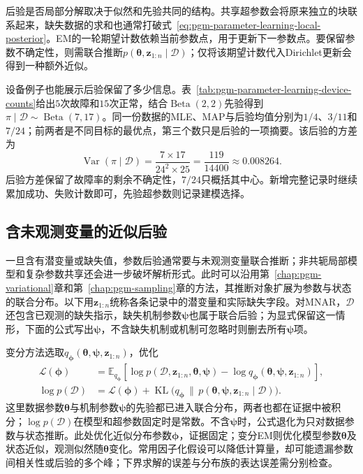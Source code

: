 后验是否局部分解取决于似然和先验共同的结构。共享超参数会将原来独立的块联系起来，缺失数据的求和也通常打破式~\eqref{eq:pgm-parameter-learning-local-posterior}。EM的一轮期望计数依赖当前参数点，用于更新下一参数点。要保留参数不确定性，则需联合推断$p(\bm{\theta},\bm{z}_{1:n}\mid\mathcal{D})$；仅将该期望计数代入Dirichlet更新会得到一种额外近似。

设备例子也能展示后验保留了多少信息。表~\ref{tab:pgm-parameter-learning-device-counts}给出$5$次故障和$15$次正常，结合$\operatorname{Beta}(2,2)$先验得到$\pi\mid\mathcal{D}\sim\operatorname{Beta}(7,17)$。同一份数据的MLE、MAP与后验均值分别为$1/4$、$3/11$和$7/24$；前两者是不同目标的最优点，第三个数只是后验的一项摘要。该后验的方差为
\[
  \operatorname{Var}(\pi\mid\mathcal{D})
   =\frac{7\times17}{24^2\times25}
   =\frac{119}{14400}\approx0.008264.
\]
后验方差保留了故障率的剩余不确定性，$7/24$只概括其中心。新增完整记录时继续累加成功、失败计数即可，先验超参数则记录建模选择。

\subsection{含未观测变量的近似后验}
\label{sec:pgm-parameter-learning-approximate-posterior}

一旦含有潜变量或缺失值，参数后验通常要与未观测变量联合推断；非共轭局部模型和复杂参数共享还会进一步破坏解析形式。此时可以沿用第~\ref{chap:pgm-variational}章和第~\ref{chap:pgm-sampling}章的方法，其推断对象扩展为参数与状态的联合分布。以下用$\bm{z}_{1:n}$统称各条记录中的潜变量和实际缺失字段。对MNAR，$\mathcal{D}$还包含已观测的缺失指示，缺失机制参数$\bm{\psi}$也属于联合后验；为显式保留这一情形，下面的公式写出$\bm{\psi}$，不含缺失机制或机制可忽略时则删去所有$\bm{\psi}$项。

变分方法选取$q_{\bm{\phi}}(\bm{\theta},\bm{\psi},\bm{z}_{1:n})$，优化
\begin{equation}
  \begin{aligned}
    \mathcal{L}(\bm{\phi})
      &=\mathbb{E}_{q_{\bm{\phi}}}
       [\log p(\mathcal{D},\bm{z}_{1:n},\bm{\theta},\bm{\psi})
        -\log q_{\bm{\phi}}
          (\bm{\theta},\bm{\psi},\bm{z}_{1:n})],\\
    \log p(\mathcal{D})
      &=\mathcal{L}(\bm{\phi})
        +\operatorname{KL}\bigl(
          q_{\bm{\phi}}\,\|\,
          p(\bm{\theta},\bm{\psi},\bm{z}_{1:n}\mid\mathcal{D})
        \bigr).
  \end{aligned}
  \label{eq:pgm-parameter-learning-bayesian-elbo}
\end{equation}
这里数据参数$\bm{\theta}$与机制参数$\bm{\psi}$的先验都已进入联合分布，两者也都在证据中被积分；$\log p(\mathcal{D})$在模型和超参数固定时是常数。不含$\bm{\psi}$时，公式退化为只对数据参数与状态推断。此处优化近似分布参数$\bm{\phi}$，证据固定；变分EM则优化模型参数$\bm{\theta}$及状态近似，观测似然随$\bm{\theta}$变化。常用因子化假设可以降低计算量，却可能遗漏参数间相关性或后验的多个峰；下界求解的误差与分布族的表达误差需分别检查。

